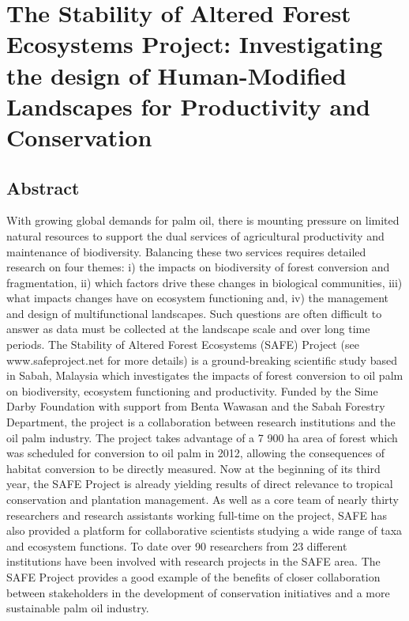\section*{The Stability of Altered Forest Ecosystems Project: Investigating the design of Human-Modified Landscapes for Productivity and Conservation \citep{Turner2012}}

\subsection*{Abstract}
With growing global demands for palm oil, there is mounting pressure on limited natural resources to support the dual services of agricultural productivity and maintenance of biodiversity. Balancing these two services requires detailed research on four themes: i) the impacts on biodiversity of forest conversion and fragmentation, ii) which factors drive these changes in biological communities, iii) what impacts changes have on ecosystem functioning and, iv) the management and design of multifunctional landscapes. Such questions are often difficult to answer as data must be collected at the landscape scale and over long time periods. The Stability of Altered Forest Ecosystems (SAFE) Project (see www.safeproject.net for more details) is a ground-breaking scientific study based in Sabah, Malaysia which investigates the impacts of forest conversion to oil palm on biodiversity, ecosystem functioning and productivity. Funded by the Sime Darby Foundation with support from Benta Wawasan and the Sabah Forestry Department, the project is a collaboration between research institutions and the oil palm industry. The project takes advantage of a 7 900 ha area of forest which was scheduled for conversion to oil palm in 2012, allowing the consequences of habitat conversion to be directly measured. Now at the beginning of its third year, the SAFE Project is already yielding results of direct relevance to tropical conservation and plantation management. As well as a core team of nearly thirty researchers and research assistants working full-time on the project, SAFE has also provided a platform for collaborative scientists studying a wide range of taxa and ecosystem functions. To date over 90 researchers from 23 different institutions have been involved with research projects in the SAFE area. The SAFE Project provides a good example of the benefits of closer collaboration between stakeholders in the development of conservation initiatives and a more sustainable palm oil industry.

